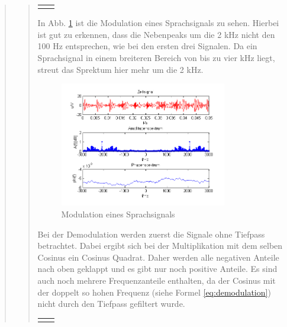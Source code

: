 \begin{quote}
\begin{quote}
\begin{center}
\begin{tabular}{ll}
{\begin{minipage}{0.6\textwidth}
            \end{minipage}}
        
        \end{tabular}
        \end{center}
        
        In Abb. \ref{fig:Sprache} ist die Modulation eines Sprachsignals zu
        sehen. Hierbei ist gut zu erkennen, dass die Nebenpeaks um die 2 kHz
        nicht den 100 Hz entsprechen, wie bei den ersten drei Signalen. Da ein
        Sprachsignal in einem breiteren Bereich von bis zu vier kHz liegt,
        streut das Sprektum hier mehr um die 2 kHz.
        
    \begin{figure}[H]
		\begin{center}
			\includegraphics[width=0.8\textwidth]{Bilder/Sprachsignal}
		\end{center}
		\caption{Modulation eines Sprachsignals}
		\label{fig:Sprache}
	\end{figure}
        
        Bei der Demodulation werden zuerst die Signale ohne Tiefpass betrachtet.
        Dabei ergibt sich bei der Multiplikation mit dem selben Cosinus ein
        Cosinus Quadrat. Daher werden alle negativen Anteile nach oben geklappt
        und es gibt nur noch positive Anteile. Es sind auch noch mehrere
        Frequenzanteile enthalten, da der Cosinus mit der doppelt so hohen
        Frequenz (siehe Formel \ref{eq:demodulation}) nicht durch den Tiefpass
        gefiltert wurde.
      
         \begin{center}
        \begin{tabular}{ll}
        
        \hspace{-5cm}
            \begin{minipage}{0.6\textwidth}
                

\end{minipage}
\end{tabular}
\end{center}
\end{quote}
\end{quote}
